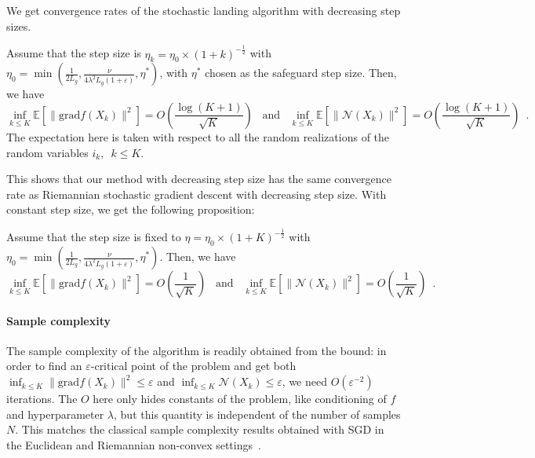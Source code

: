 \documentclass[twoside,11pt]{article}
\newcommand{\grad}{{\mathrm{grad}}}
\newcommand{\finalrevision}[1]{{#1}}
\begin{document}
We get convergence rates of the stochastic landing algorithm with decreasing step sizes. 

\begin{proposition}
\label{prop:convergence_stochastic_decreasing_step}
  Assume that the step size is $\eta_k = \eta_0 \times (1 + k)^{-\frac12}$ with $\eta_0 = \min(\frac1{2L_g}, \frac{\nu}{4\lambda^2L_g(1+\varepsilon)}, \eta^*)$, with $\eta^*$ chosen as the safeguard step size.
  Then, we have 
  $$
  \inf_{k\leq K}\mathbb{E}[\|\grad f(X_k)\|^2] =O\left(\frac{\log(K+1)}{\sqrt{K}}\right)\enspace \text{ and } \enspace \inf_{k\leq K}\mathbb{E}[\|\mathcal{N}(X_k)\|^2] =O\left(\frac{\log(K+1)}{\sqrt{K}}\right) \enspace.
  $$
  The expectation here is taken with respect to all the random realizations of the random variables $i_k, \enspace k\leq K$.
\end{proposition}
%
%
%
%
%
%
%
%
%

%
%
%
%
%
%
%
%
%
%
%


This shows that our method with decreasing step size has the same convergence rate as Riemannian stochastic gradient descent with decreasing step size.
With constant step size, we get the following proposition:

\begin{proposition}
\label{prop:convergence_stochastic_fixed_step}
  Assume that the step size is fixed to $\eta = \eta_0 \times (1 + K)^{-\frac12}$ with $\eta_0 = \min(\frac1{2L_g}, \frac{\nu}{4\lambda^2L_g(1+\varepsilon)}, \eta^*)$.
  Then, we have 
  $$
  \inf_{k\leq K}\mathbb{E}[\|\grad f(X_k)\|^2] =O\left(\frac{1}{\sqrt{K}}\right)\enspace \text{ and } \enspace \inf_{k\leq K}\mathbb{E}[\|\mathcal{N}(X_k)\|^2] =O\left(\frac{1}{\sqrt{K}}\right)\enspace.
  $$
\end{proposition}
\paragraph{Sample complexity}
The sample complexity of the algorithm is readily obtained from the bound: in order to find an $\varepsilon$-critical point of the problem and get both $\inf_{k\leq K}\|\grad f(X_k)\|^2 \leq \varepsilon$ and $\inf_{k\leq K}\mathcal{N}(X_k)\leq \varepsilon$, we need $O(\varepsilon^{-2})$ iterations.
The $O$ here only hides constants of the problem, like conditioning of $f$ and hyperparameter $\lambda$, but this quantity is independent of the number of samples $N$.
This matches the classical sample complexity results obtained with SGD in the Euclidean and Riemannian non-convex settings\finalrevision{~\citep{zhang2016riemannian}}.
\end{document}
